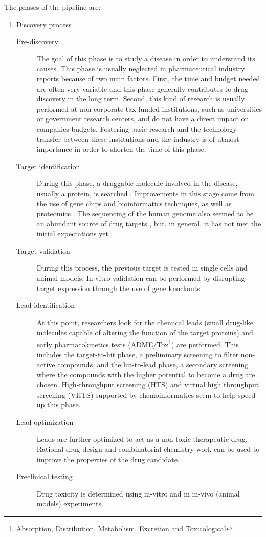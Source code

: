 The phases of the pipeline are:
\begin {enumerate}
\item Discovery process
\begin {description}
\item [Pre-discovery] The goal of this phase is to study a disease in order to understand its causes. This phase is usually neglected in pharmaceutical industry reports because of two main factors. First, the time and budget needed are often very variable and this phase generally contributes to drug discovery in the long term. Second, this kind of research is usually performed at non-corporate tax-funded institutions, such as universities or government research centers, and do not have a direct impact on companies budgets. Fostering basic research and the technology transfer between these institutions and the industry is of utmost importance in order to shorten the time of this phase.
\item [Target identification] During this phase, a druggable molecule involved in the disease, usually a protein, is searched . Improvements in this stage come from the use of gene chips and bioinformatics techniques, as well as proteomics \cite{cutler_proteomics_2015}. The sequencing of the human genome also seemed to be an abundant source of drug targets \cite{ grenet_significance_2001, hopkins_druggable_2002}, but, in general, it has not met the initial expectations yet  \cite{garnier_rebuilding_????}. 
\item [Target validation] During this process, the previous target is tested in single cells and animal models. In-vitro validation can be performed by disrupting target expression through the use of  gene knockouts. 
\item [Lead identification] At this point, researchers look for the chemical leads (small drug-like molecules capable of altering the function of the target proteins) and early pharmacokinetics tests (ADME/Tox\footnote{Absorption, Distribution, Metabolism, Excretion and Toxicological}) are performed. This includes the target-to-hit phase, a preliminary screening to filter non-active compounds, and the hit-to-lead phase, a secondary screening where the compounds with the higher potential to become a drug are chosen. High-throughput screening (HTS) and virtual high throughput screening (VHTS) supported by chemoinformatics seem to help speed up this phase. 
\item [Lead optimization] Leads are further optimized to act as a non-toxic therapeutic drug. Rational drug design and combinatorial chemistry work can be used to improve the  properties of the drug candidate.
\item [Preclinical testing] Drug toxicity is determined using in-vitro and in in-vivo (animal models) experiments.
\end {description}


\end{enumerate}
